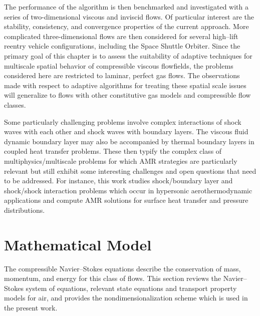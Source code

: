 The performance of the algorithm is then benchmarked and investigated with a series of two-dimensional viscous and inviscid flows. Of particular interest are the stability, consistency, and convergence properties of the current approach.  More complicated three-dimensional flows are then considered for several high--lift reentry vehicle configurations, including the Space Shuttle Orbiter.  Since the primary goal of this chapter is to assess the suitability of adaptive techniques for multiscale spatial behavior of  compressible viscous flowfields, the problems considered here are restricted to laminar, perfect gas flows.  The observations made with respect to adaptive algorithms for treating these spatial scale issues will generalize to flows with other constitutive gas models and compressible flow classes.

Some particularly challenging problems involve complex interactions of shock waves with each other and shock waves with boundary layers.  The viscous fluid dynamic boundary layer  may also be accompanied by thermal boundary layers in coupled heat transfer problems.  These then typify the complex class of multiphysics/multiscale problems for which AMR strategies are particularly relevant but still exhibit some interesting challenges and open questions that need to be addressed.  For instance, this work studies shock/boundary layer and shock/shock interaction problems which occur in hypersonic aerothermodynamic applications and compute AMR solutions for surface heat transfer and pressure distributions.

\section{Mathematical Model\label{eq:comp_ns_math_model}}
The compressible Navier--Stokes equations describe the conservation of mass, momentum, and energy for this class of flows.  This section reviews the Navier--Stokes system of equations, relevant state equations and transport property models for air, and provides the nondimensionalization scheme which is used in the present work.
